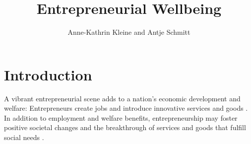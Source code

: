 \documentclass[a4paper,man,natbib]{apa6}
\title{Entrepreneurial Wellbeing}
\author{Anne-Kathrin Kleine and Antje Schmitt}
\affiliation{University of Groningen}
\begin{document}
\maketitle

\section{Introduction}
A vibrant entrepreneurial scene adds to a nation’s economic development and welfare: Entrepreneurs create jobs and introduce innovative services and goods \citep{Acs.1988, Schumpeter.1934}. In addition to employment and welfare benefits, entrepreneurship may foster positive societal changes and the breakthrough of services and goods that fulfill social needs \cite[e.g.][]{Certo2008, Stephan2018, Wiklund2019}. 


\end{document}
